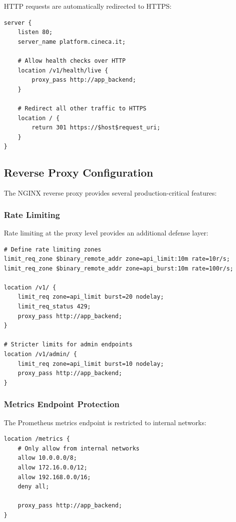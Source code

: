 HTTP requests are automatically redirected to HTTPS:

\begin{lstlisting}[language=nginx, caption=HTTP to HTTPS redirect]
server {
    listen 80;
    server_name platform.cineca.it;
    
    # Allow health checks over HTTP
    location /v1/health/live {
        proxy_pass http://app_backend;
    }
    
    # Redirect all other traffic to HTTPS
    location / {
        return 301 https://$host$request_uri;
    }
}
\end{lstlisting}

\subsection{Reverse Proxy Configuration}

The NGINX reverse proxy provides several production-critical features:

\subsubsection{Rate Limiting}

Rate limiting at the proxy level provides an additional defense layer:

\begin{lstlisting}[language=nginx, caption=NGINX rate limiting zones]
# Define rate limiting zones
limit_req_zone $binary_remote_addr zone=api_limit:10m rate=10r/s;
limit_req_zone $binary_remote_addr zone=api_burst:10m rate=100r/s;

location /v1/ {
    limit_req zone=api_limit burst=20 nodelay;
    limit_req_status 429;
    proxy_pass http://app_backend;
}

# Stricter limits for admin endpoints
location /v1/admin/ {
    limit_req zone=api_limit burst=10 nodelay;
    proxy_pass http://app_backend;
}
\end{lstlisting}

\subsubsection{Metrics Endpoint Protection}

The Prometheus metrics endpoint is restricted to internal networks:

\begin{lstlisting}[language=nginx, caption=Metrics endpoint access control]
location /metrics {
    # Only allow from internal networks
    allow 10.0.0.0/8;
    allow 172.16.0.0/12;
    allow 192.168.0.0/16;
    deny all;
    
    proxy_pass http://app_backend;
}
\end{lstlisting}


